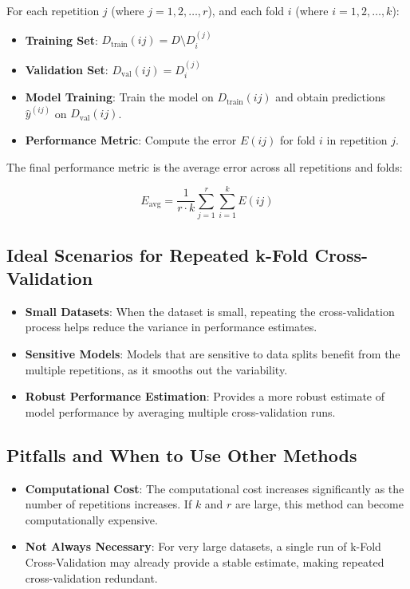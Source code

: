 \documentclass[10pt]{article}
\begin{document}
For each repetition \(j\) (where \(j = 1, 2, \dots, r\)), and each fold \(i\) (where \(i = 1, 2, \dots, k\)):

\begin{itemize}
    \item \textbf{Training Set}: \(D_{\text{train}}(ij) = D \setminus D_i^{(j)}\)
    \item \textbf{Validation Set}: \(D_{\text{val}}(ij) = D_i^{(j)}\)
    \item \textbf{Model Training}: Train the model on \(D_{\text{train}}(ij)\) and obtain predictions \(\hat{y}^{(ij)}\) on \(D_{\text{val}}(ij)\).
    \item \textbf{Performance Metric}: Compute the error \(E(ij)\) for fold \(i\) in repetition \(j\).
\end{itemize}

The final performance metric is the average error across all repetitions and folds:

\[
E_{\text{avg}} = \frac{1}{r \cdot k} \sum_{j=1}^{r} \sum_{i=1}^{k} E(ij)
\]

\subsection{Ideal Scenarios for Repeated k-Fold Cross-Validation}
\begin{itemize}
    \item \textbf{Small Datasets}: When the dataset is small, repeating the cross-validation process helps reduce the variance in performance estimates.
    \item \textbf{Sensitive Models}: Models that are sensitive to data splits benefit from the multiple repetitions, as it smooths out the variability.
    \item \textbf{Robust Performance Estimation}: Provides a more robust estimate of model performance by averaging multiple cross-validation runs.
\end{itemize}

\subsection{Pitfalls and When to Use Other Methods}
\begin{itemize}
    \item \textbf{Computational Cost}: The computational cost increases significantly as the number of repetitions increases. If \(k\) and \(r\) are large, this method can become computationally expensive.
    \item \textbf{Not Always Necessary}: For very large datasets, a single run of k-Fold Cross-Validation may already provide a stable estimate, making repeated cross-validation redundant.
\end{itemize}
\end{document}
